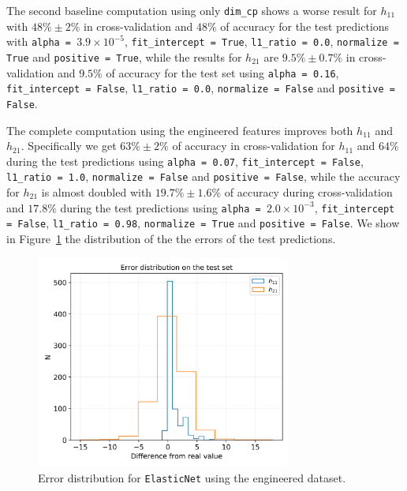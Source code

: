     The second baseline computation using only \texttt{dim\_cp} shows a worse result for $h_{11}$ with $48\% \pm 2\%$ in cross-validation and $48\%$ of accuracy for the test predictions with \texttt{alpha = $3.9 \times 10^{-5}$}, \texttt{fit\_intercept = True}, \texttt{l1\_ratio = 0.0}, \texttt{normalize = True} and \texttt{positive = True}, while the results for $h_{21}$ are $9.5\% \pm 0.7\%$ in cross-validation and $9.5\%$ of accuracy for the test set using \texttt{alpha = 0.16}, \texttt{fit\_intercept = False}, \texttt{l1\_ratio = 0.0}, \texttt{normalize = False} and \texttt{positive = False}.
    
    The complete computation using the engineered features improves both $h_{11}$ and $h_{21}$. Specifically we get $63\% \pm 2\%$ of accuracy in cross-validation for $h_{11}$ and $64\%$ during the test predictions using \texttt{alpha = 0.07}, \texttt{fit\_intercept = False}, \texttt{l1\_ratio = 1.0}, \texttt{normalize = False} and \texttt{positive = False}, while the accuracy for $h_{21}$ is almost doubled with $19.7\% \pm 1.6\%$ of accuracy during cross-validation and $17.8\%$ during the test predictions using \texttt{alpha = $2.0 \times 10^{-3}$}, \texttt{fit\_intercept = False}, \texttt{l1\_ratio = 0.98}, \texttt{normalize = True} and \texttt{positive = False}. We show in Figure~\ref{fig:el_net_err} the distribution of the the errors of the test predictions.
    
    \begin{figure}[t]
        \centering
        \includegraphics[width=0.75\textwidth]{tex/img/el_net_error_eng.png}
        \caption{Error distribution for \texttt{ElasticNet} using the engineered dataset.}
        \label{fig:el_net_err}
    \end{figure}
    
